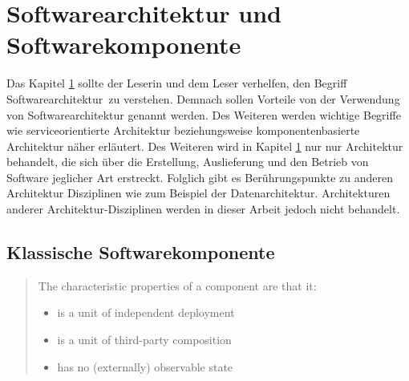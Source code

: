 \section{Softwarearchitektur und Softwarekomponente}
\label{sec:2_Architektur}
Das Kapitel \ref{sec:2_Architektur} sollte der Leserin und dem Leser verhelfen, den Begriff \glqq Softwarearchitektur\grqq\ zu verstehen. Demnach sollen Vorteile von der Verwendung von Softwarearchitektur genannt werden. Des Weiteren werden wichtige Begriffe wie serviceorientierte Architektur beziehungsweise komponentenbasierte Architektur näher erläutert.
Des Weiteren wird in Kapitel \ref{sec:2_Architektur} nur nur Architektur behandelt, die sich über die Erstellung, Auslieferung und den Betrieb von Software jeglicher Art erstreckt. Folglich gibt es Berührungspunkte zu anderen Architektur Disziplinen wie zum Beispiel der Datenarchitektur. Architekturen anderer Architektur-Disziplinen werden in dieser Arbeit jedoch nicht behandelt.

\subsection{Klassische Softwarekomponente}
\label{sec:2_Softwarekomponente_Klassisch}
\begin{quote}
The characteristic properties of a component are that it:
\begin{itemize}
\item is a unit of independent deployment
\item is a unit of third-party composition
\item has no (externally) observable state
\end{itemize}
\end{quote}

